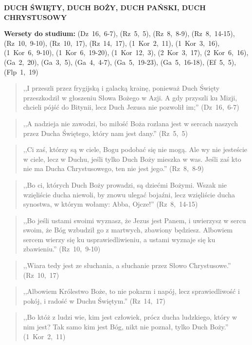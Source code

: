 \documentclass[10pt,a4paper,oneside]{article}
\begin{document}
\centerline{\textbf{\MakeUppercase{Duch Święty, Duch Boży, Duch Pański, Duch Chrystusowy}}}
\begin{center}
\textbf{Wersety do studium:} (Dz~16,~6-7), (Rz~5,~5), (Rz~8,~8-9), (Rz~8,~14-15), (Rz~10,~9-10), (Rz~10,~17), (Rz~14,~17), (1~Kor~2,~11), (1~Kor~3,~16), (1~Kor~6,~9-10), (1~Kor~6,~19-20), (1~Kor~12,~3), (2~Kor~3,~17), (2~Kor~6,~16), (Ga~2,~20), (Ga~3,~5), (Ga~4,~4-7), (Ga~5,~19-23), (Ga~5,~16-18), (Ef~5,~5), (Flp~1,~19)
\end{center}
\begin{quote}
,,I przeszli przez frygijską i galacką krainę, ponieważ Duch Święty przeszkodził w głoszeniu Słowa Bożego w Azji. A gdy przyszli ku Mizji, chcieli pójść do Bitynii, lecz Duch Jezusa nie pozwolił im;'' (Dz~16,~6-7)
\end{quote}
\begin{quote}
,,A nadzieja nie zawodzi, bo miłość Boża rozlana jest w sercach naszych przez Ducha Świętego, który nam jest dany.'' (Rz~5,~5)
\end{quote}
\begin{quote}
,,Ci zaś, którzy są w ciele, Bogu podobać się nie mogą. Ale wy nie jesteście w ciele, lecz w Duchu, jeśli tylko Duch Boży mieszka w was. Jeśli zaś kto nie ma Ducha Chrystusowego, ten nie jest jego.'' (Rz~8,~8-9)
\end{quote}
\begin{quote}
,,Bo ci, których Duch Boży prowadzi, są dziećmi Bożymi. Wszak nie wzięliście ducha niewoli, by znowu ulegać bojaźni, lecz wzięliście ducha synostwa, w którym wołamy: Abba, Ojcze!'' (Rz~8,~14-15)
\end{quote}
\begin{quote}
,,Bo jeśli ustami swoimi wyznasz, że Jezus jest Panem, i uwierzysz w sercu swoim, że Bóg wzbudził go z martwych, zbawiony będziesz. Albowiem sercem wierzy się ku usprawiedliwieniu, a ustami wyznaje się ku zbawieniu.'' (Rz~10,~9-10)
\end{quote}
\begin{quote}
,,Wiara tedy jest ze słuchania, a słuchanie przez Słowo Chrystusowe.'' (Rz~10,~17)
\end{quote}
\begin{quote}
,,Albowiem Królestwo Boże, to nie pokarm i napój, lecz sprawiedliwość i pokój, i radość w Duchu Świętym.'' (Rz~14,~17)
\end{quote}
\begin{quote}
,,Bo któż z ludzi wie, kim jest człowiek, prócz ducha ludzkiego, który w nim jest? Tak samo kim jest Bóg, nikt nie poznał, tylko Duch Boży.'' (1~Kor~2,~11)
\end{quote}
\end{document}
